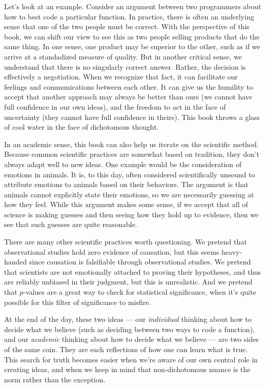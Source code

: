 \documentclass[9pt, twoside]{book}
\theoremstyle{argtstyle}
\begin{document}
Let's look at an example. 
Consider an argument between two programmers about how to best code a
particular function.
In practice, there is often an underlying sense that one
of the two people must be correct.
With the perspective of this book, we can
shift our view to see this as two people selling products that do the same
thing.
In one sense, one product may be superior to the other, such as if we
arrive at a standadized measure of quality.
But in another critical
sense, we understand that there is no singularly correct answer.
Rather, the decision is effectively a negotiation.
When we recognize that fact, it
can facilitate our feelings and communications between each other.
It can give
us the humility to accept that another approach may always be better than ours
(we cannot have full confidence in our own ideas),
and the freedom to act in the face of
uncertainty
(they cannot have full confidence in theirs).
This
book throws
a glass of cool water in the face of dichotomous thought.

In an academic sense, this book can also help us iterate on the scientific
method.
Because common scientific practices are somewhat based on tradition,
they don't
always adapt well to new ideas.
One example would be the consideration of emotions in animals.
It is, to this day, often considered scientifically unsound to attribute
emotions to animals based on their behaviors. The argument is that animals
cannot explicitly state their emotions, so we are necessarily guessing at how
they feel. While this argument makes some sense, if we accept that all of
science is making guesses and then seeing how they hold up to evidence, then we
see that such guesses are quite reasonable.

There are many other scientific practices worth questioning.
We pretend that observational studies hold zero evidence of causation, but this
seems heavy-handed since causation is falsifiable through observational
studies. We pretend that scientists are not emotionally attached to proving
their hypotheses, and thus are reliably unbiased in their judgment, but this is
unrealistic. And we pretend that $p$-values are a great way to check for
statistical significance, when it's quite possible for this filter of
significance to misfire.

At the end of the day, these two ideas --- our {\em individual}
thinking about how to
decide what we believe (such as deciding between two ways to code a function),
and our {\em academic} thinking about how to decide what we believe --- are two
sides of the same coin. They are each reflections of how one can learn what is
true. This search for truth becomes easier when we're aware of our
own central role in creating ideas, and when we keep in mind that
non-dichotomous nuance is the norm rather than the exception.
\end{document}
